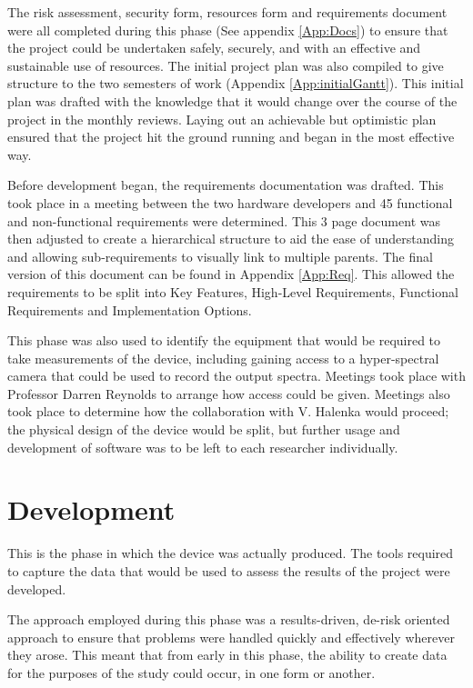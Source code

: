 The risk assessment, security form, resources form and requirements document were all completed during this phase (See appendix \ref{App:Docs}) to ensure that the project could be undertaken safely, securely, and with an effective and sustainable use of resources. The initial project plan was also compiled to give structure to the two semesters of work (Appendix \ref{App:initialGantt}). This initial plan was drafted with the knowledge that it would change over the course of the project in the monthly reviews. Laying out an achievable but optimistic plan ensured that the project hit the ground running and began in the most effective way.

Before development began, the requirements documentation was drafted. This took place in a meeting between the two hardware developers and 45 functional and non-functional requirements were determined. This 3 page document was then adjusted to create a hierarchical structure to aid the ease of understanding and allowing sub-requirements to visually link to multiple parents. The final version of this document can be found in Appendix \ref{App:Req}. This allowed the requirements to be split into Key Features, High-Level Requirements, Functional Requirements and Implementation Options.

This phase was also used to identify the equipment that would be required to take measurements of the device, including gaining access to a hyper-spectral camera that could be used to record the output spectra. Meetings took place with Professor Darren Reynolds to arrange how access could be given. Meetings also took place to determine how the collaboration with V. Halenka would proceed; the physical design of the device would be split, but further usage and development of software was to be left to each researcher individually.

\section{Development}

This is the phase in which the device was actually produced. The tools required to capture the data that would be used to assess the results of the project were developed.

The approach employed during this phase was a results-driven, de-risk oriented approach to ensure that problems were handled quickly and effectively wherever they arose. This meant that from early in this phase, the ability to create data for the purposes of the study could occur, in one form or another.


